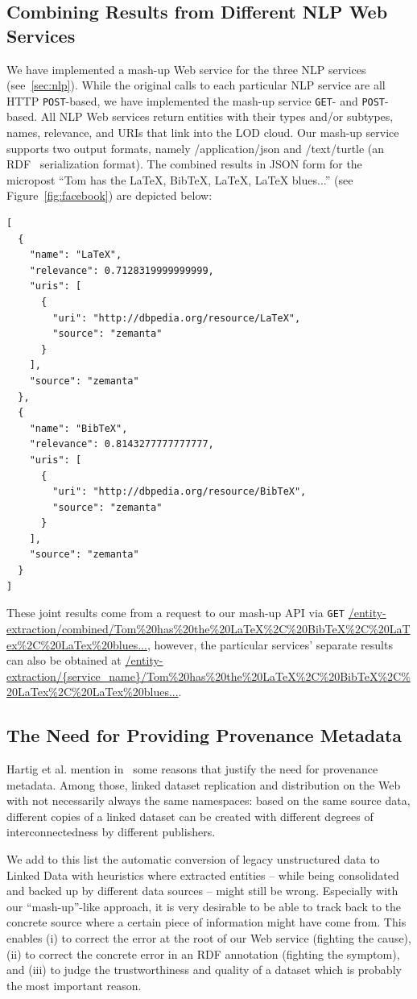 \documentclass[conference]{IEEEtran}
\begin{document}
\subsection{Combining Results from Different NLP Web Services}                     \label{sec:consolidation-nlp}
We have implemented a mash-up Web service for the three NLP services (see~\ref{sec:nlp}). While the original calls to each particular NLP service are all HTTP \texttt{POST}-based, we have implemented the mash-up service \texttt{GET}- and \texttt{POST}-based. All NLP Web services return entities with their types and/or subtypes, names, relevance, and URIs that link into the LOD cloud. Our mash-up service supports two output formats, namely /application/json and /text/turtle (an RDF~\cite{RDF} serialization format). The combined results in JSON form for the micropost ``Tom has the LaTeX, BibTeX, LaTeX, LaTeX blues...'' (see Figure~\ref{fig:facebook}) are depicted below:
\begin{lstlisting}
[
  {
    "name": "LaTeX",
    "relevance": 0.7128319999999999,
    "uris": [
      {
        "uri": "http://dbpedia.org/resource/LaTeX",
        "source": "zemanta"
      }
    ],
    "source": "zemanta"
  },
  {
    "name": "BibTeX",
    "relevance": 0.8143277777777777,
    "uris": [
      {
        "uri": "http://dbpedia.org/resource/BibTeX",
        "source": "zemanta"
      }
    ],
    "source": "zemanta"
  }  
]
\end{lstlisting}

These joint results come from a request to our mash-up API via \texttt{GET} \url{/entity-extraction/combined/Tom%20has%20the%20LaTeX%2C%20BibTeX%2C%20LaTex%2C%20LaTex%20blues...},
however, the particular services' separate results can also be obtained at \url{/entity-extraction/{service_name}/Tom%20has%20the%20LaTeX%2C%20BibTeX%2C%20LaTex%2C%20LaTex%20blues...}.

\subsection{The Need for Providing Provenance Metadata}
Hartig et al. mention in~\cite{ipaw10:olaf} some reasons that justify the need for provenance metadata. Among those, linked dataset replication and distribution on the Web with not necessarily always the same namespaces: based on the same source data, different copies of a linked dataset can be created with different degrees of interconnectedness by different publishers.

We add to this list the automatic conversion of legacy unstructured data to Linked Data with heuristics where extracted entities -- while being consolidated and backed up by different data sources -- might still be wrong. Especially with our ``mash-up''-like approach, it is very desirable to be able to track back to the concrete source where a certain piece of information might have come from. This enables (i) to correct the error at the root of our Web service (fighting the cause), (ii) to correct the concrete error in an RDF annotation (fighting the symptom), and (iii) to judge the trustworthiness and quality of a dataset which is probably the most important reason.
\end{document}
